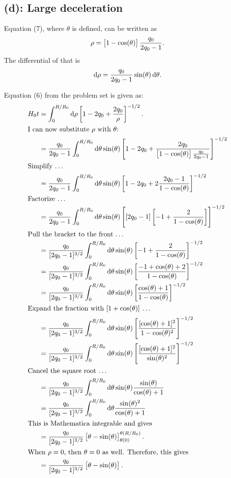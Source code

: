 \subsection*{(d): Large deceleration}

Equation (7), where $\theta$ is defined, can be written as
\[
    \rho = \sbr{1 - \cos(\theta)} \frac{q_0}{2q_0 - 1}.
\]
The differential of that is
\[
    \dif \rho = \frac{q_0}{2q_0 - 1} \sin(\theta) \dif \theta.
\]

Equation (6) from the problem set is given as:
\label{sec:P12-d}
\begin{align*}
    H_0 t &= \int_0^{R/R_0} \dif \rho \sbr{1-2q_0 + \frac{2q_0}{\rho}}^{-1/2}.
    \\
    \intertext{%
        I can now substitute $\rho$ with $\theta$:
    }
    &= \frac{q_0}{2q_0 - 1} \int_0^{R/R_0} \dif \theta \sin(\theta) \sbr{1-2q_0 + \frac{2q_0}{\sbr{1 - \cos(\theta)} \frac{q_0}{2q_0 - 1}}}^{-1/2}
    \\
    \intertext{%
        Simplify …
    }
    &= \frac{q_0}{2q_0 - 1} \int_0^{R/R_0} \dif \theta \sin(\theta)
    \sbr{1-2q_0 + 2 \frac{2q_0 - 1}{1 - \cos(\theta)}}^{-1/2} \\
    \intertext{%
        Factorize …
    }
    &= \frac{q_0}{2q_0 - 1} \int_0^{R/R_0} \dif \theta \sin(\theta)
    \sbr{[2q_0-1]\sbr{-1 + \frac{2}{1 - \cos(\theta)}}}^{-1/2} \\
    \intertext{%
        Pull the bracket to the front …
    }
    &= \frac{q_0}{[2q_0 - 1]^{3/2}} \int_0^{R/R_0} \dif \theta \sin(\theta)
    \sbr{-1 + \frac{2}{1 - \cos(\theta)}}^{-1/2} \\
    &= \frac{q_0}{[2q_0 - 1]^{3/2}} \int_0^{R/R_0} \dif \theta \sin(\theta)
    \sbr{\frac{-1 + \cos(\theta) + 2}{1 - \cos(\theta)}}^{-1/2} \\
    &= \frac{q_0}{[2q_0 - 1]^{3/2}} \int_0^{R/R_0} \dif \theta \sin(\theta)
    \sbr{\frac{\cos(\theta) + 1}{1 - \cos(\theta)}}^{-1/2} \\
    \intertext{%
        Expand the fraction with $[1 + \cos(\theta)]$ …
    }
    &= \frac{q_0}{[2q_0 - 1]^{3/2}} \int_0^{R/R_0} \dif \theta \sin(\theta)
    \sbr{\frac{[\cos(\theta) + 1]^2}{1 - \cos(\theta)^2}}^{-1/2} \\
    &= \frac{q_0}{[2q_0 - 1]^{3/2}} \int_0^{R/R_0} \dif \theta \sin(\theta)
    \sbr{\frac{[\cos(\theta) + 1]^2}{\sin(\theta)^2}}^{-1/2} \\
    \intertext{%
        Cancel the square root …
    }
    &= \frac{q_0}{[2q_0 - 1]^{3/2}} \int_0^{R/R_0} \dif \theta \sin(\theta)
    \frac{\sin(\theta)}{\cos(\theta) + 1} \\
    &= \frac{q_0}{[2q_0 - 1]^{3/2}} \int_0^{R/R_0} \dif \theta
    \frac{\sin(\theta)^2}{\cos(\theta) + 1} \\
    \intertext{%
        This is Mathematica integrable and gives
    }
    &= \frac{q_0}{[2q_0 - 1]^{3/2}} \sbr{\theta -
    \sin(\theta)}_{\theta(0)}^{\theta(R/R_0)}. \\
    \intertext{%
        When $\rho = 0$, then $\theta = 0$ as well. Therefore, this gives
    }
    &= \frac{q_0}{[2q_0 - 1]^{3/2}} \sbr{\theta -
    \sin(\theta)}.
\end{align*}

